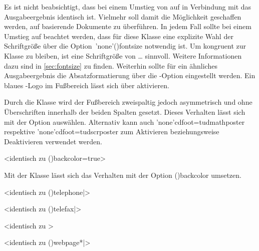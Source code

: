 \begin{DeclareEntity}{}
Es ist nicht beabsichtigt, dass bei einem Umstieg von  auf 
 in Verbindung mit  das Ausgabeergebnis 
identisch ist. Vielmehr soll damit die Möglichkeit geschaffen werden, auf 
 basierende Dokumente zu überführen. In jedem Fall sollte 
bei einem Umstieg auf  beachtet werden, dass für diese 
Klasse eine explizite Wahl der Schriftgröße über die 
Option~\Option'none'(){fontsize} notwendig ist. Um 
kongruent zur Klasse  zu bleiben, ist eine Schriftgröße 
von \PValue{34pt}\dots\PValue{36pt} sinnvoll. Weitere Informationen dazu 
sind in \autoref{sec:fontsize} zu finden. Weiterhin sollte für ein 
ähnliches Ausgabeergebnis die Absatzformatierung über die \KOMAScript-Option 
 eingestellt werden. Ein blaues \DDC-Logo im Fußbereich 
lässt sich über  aktivieren.

\begin{Declaration}
  {}
\printdeclarationlist

Durch die Klasse  wird der Fußbereich zweispaltig jedoch 
asymmetrisch und ohne Überschriften innerhalb der beiden Spalten gesetzt. 
Dieses Verhalten lässt sich mit der Option  
auswählen. Alternativ kann auch \Option*'none'{cdfoot=tudmathposter} respektive 
\Option*'none'{cdfoot=tudscrposter} zum Aktivieren beziehungsweise Deaktivieren 
verwendet werden.
\end{Declaration}

\begin{Declaration}
  {}
  <identisch zu \Option*(){backcolor=true}>
\printdeclarationlist

Mit der Klasse  lässt sich das Verhalten mit der Option 
\Option*(){backcolor} umsetzen.
\end{Declaration}

\begin{Declaration}
  {}
<identisch zu \Macro*(){telephone|}>
\begin{Declaration}
  {}
  <identisch zu \Macro*(){telefax|}>
\begin{Declaration}
  {}
  <identisch zu >
\begin{Declaration}
  {}
  <identisch zu \Macro*(){webpage*|}>
\printdeclarationlist


\end{Declaration}
\end{Declaration}
\end{Declaration}
\end{Declaration}
\end{DeclareEntity}
